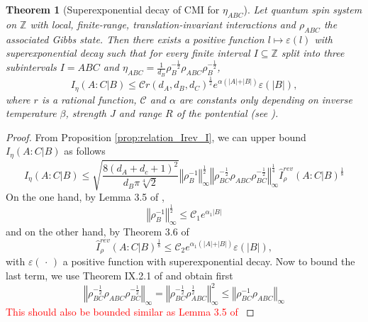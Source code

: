 \documentclass[11pt]{article}
\theoremstyle{newdefinition}
\theoremstyle{newplain}
\newtheorem{theorem}[definition]{Theorem}
\theoremstyle{myplain}
\DeclareMathOperator{\1}{\mathds{1}}
\begin{document}
{{\begin{theorem}[Superexponential decay of CMI for $\eta_{ABC}$]\label{thm:superexponential_decay}
    Let quantum spin system on $\mathbb{Z}$ with local, finite-range, translation-invariant interactions and $\rho_{ABC}$ the associated Gibbs state. Then there exists a positive function $l \mapsto \varepsilon(l)$ with  superexponential decay such that for every finite interval $I \subseteq \mathbb{Z}$ split into three subintervals $I = ABC$ and $\eta_{ABC}=\frac{1}{d_B}\rho_B^{-\frac{1}{2}}\rho_{ABC}\rho_B^{-\frac{1}{2}}$, 
\begin{equation}
    I_{\eta}(A:C\vert B)\leq \mathcal{C} r(d_A,d_B,d_C)^{\frac{1}{2}}e^{\alpha (\vert A \vert+ \vert B \vert)}\varepsilon(\vert B\vert),
\end{equation}
where $r$ is a rational function,  $\mathcal{C}$ and $\alpha$ are constants only depending on inverse temperature $\beta$, strength $J$ and range $R$ of the pontential (see \cite[Section 2.4]{gondolf2024conditional}). 
\end{theorem}
\begin{proof}
    From Proposition  \ref{prop:relation_Irev_I}, we can upper bound $I_{\eta}(A:C\vert B)$ as follows
    \begin{equation}
        I_{\eta}(A:C\vert B)\leq \sqrt{\frac{8(d_A+ d_c+1)^2}{d_B\pi \sqrt[4]{2}}}\left\Vert  \rho_B^{-1} \right\Vert_{\infty}^{\frac{1}{2}} \left\Vert \rho_{BC}^{-\frac{1}{2}}\rho_{ABC}\rho_{BC}^{-\frac{1}{2}}\right\Vert_{\infty}^{\frac{1}{4}}\widehat{I}^{rev}_{\rho}(A:C | B)^{\frac{1}{8}}
    \end{equation}
    On the one hand, by Lemma 3.5 of \cite{gondolf2024conditional}, 
    \begin{equation}
    \left\Vert  \rho_B^{-1} \right\Vert_{\infty}^{\frac{1}{2}} \leq \mathcal{C}_1 e^{\alpha_1 \vert B \vert}
    \end{equation}
    and on the other hand, by Theorem 3.6 of \cite{gondolf2024conditional}
    \begin{equation}
        \widehat{I}^{rev}_{\rho}(A:C | B)^{\frac{1}{8}}\leq \mathcal{C}_2e^{\alpha_1(\vert A\vert+\vert B\vert)}\varepsilon(\vert B \vert),
    \end{equation}
    with $\varepsilon(\hspace{2pt}\cdot \hspace{2pt})$ a positive function with superexponential decay. Now to bound the last term, we use Theorem IX.2.1 of \cite{bhatia-2013} and obtain first
    \begin{equation}
        \left\Vert \rho_{BC}^{-\frac{1}{2}}\rho_{ABC}\rho_{BC}^{-\frac{1}{2}}\right\Vert_{\infty}=\left\Vert \rho_{BC}^{-\frac{1}{2}}\rho_{ABC}^{\frac{1}{2}}\right\Vert_{\infty}^2\leq \left\Vert \rho_{BC}^{-1}\rho_{ABC}\right\Vert_{\infty}
    \end{equation}
    \textcolor{red}{This should also be bounded similar as Lemma 3.5 of \cite{gondolf2024conditional}}
\end{proof}

}}
\end{document}
